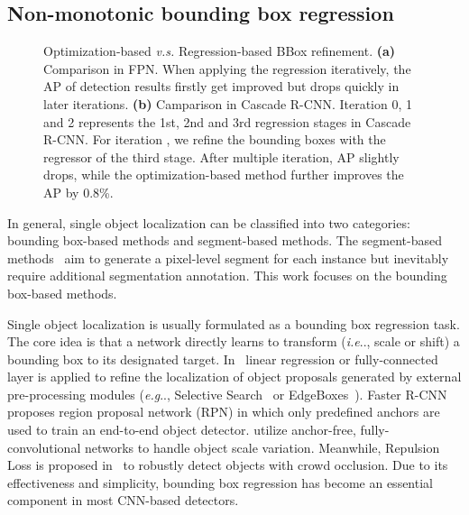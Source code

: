 \documentclass[runningheads]{llncs}
\makeatletter
\DeclareRobustCommand\onedot{\futurelet\@let@token\@onedot}
\def\@onedot{\ifx\@let@token.\else.\null\fi\xspace}
\def\eg{\emph{e.g}\onedot} \def\Eg{\emph{E.g}\onedot}
\def\ie{\emph{i.e}\onedot} \def\Ie{\emph{I.e}\onedot}
\makeatother
\begin{document}
\subsection{Non-monotonic bounding box regression}
\label{sec:problem:bbreg}

\begin{figure}[t]
\centering
{}\quad
{}
\caption{Optimization-based \emph{v.s.} Regression-based BBox refinement. \textbf{(a)} Comparison in FPN. When applying the regression iteratively, the AP of detection results firstly get improved but drops quickly in later iterations. \textbf{(b)} Camparison in Cascade R-CNN. Iteration 0, 1 and 2 represents the 1st, 2nd and 3rd regression stages in Cascade R-CNN. For iteration , we refine the bounding boxes with the regressor of the third stage. After multiple iteration, AP slightly drops, while the optimization-based method further improves the AP by 0.8\%.
}
\label{fig:apiter}
\end{figure}

In general, single object localization can be classified into two categories: bounding box-based methods and segment-based methods. The segment-based methods~\cite{pinheiro2015learning,pinheiro2016learning,hu2017fastmask,he2017mask} aim to generate a pixel-level segment for each instance but inevitably require additional segmentation annotation. This work focuses on the bounding box-based methods.

Single object localization is usually formulated as a bounding box regression task. The core idea is that a network directly learns to transform (\ie, scale or shift) a bounding box to its designated target.
In~\cite{Girshick_2014_CVPR,Girshick_2015_ICCV} linear regression or fully-connected layer is applied to refine the localization of object proposals generated by external pre-processing modules (\eg, Selective Search~\cite{uijlings2013selective} or EdgeBoxes~\cite{zitnick2014edge}). Faster R-CNN~\cite{NIPS2015_5638} proposes region proposal network (RPN) in which only predefined anchors are used to train an end-to-end object detector. \cite{huang2015densebox,yu2016unitbox} utilize anchor-free, fully-convolutional networks to handle object scale variation. Meanwhile, Repulsion Loss is proposed in~\cite{wang2017repulsion} to robustly detect objects with crowd occlusion.
Due to its effectiveness and simplicity, bounding box regression has become an essential component in most CNN-based detectors. 
\end{document}

